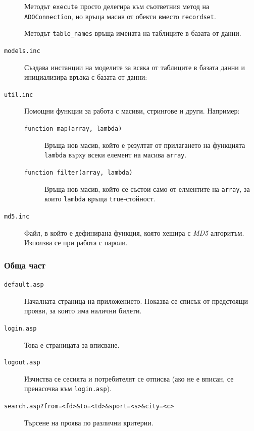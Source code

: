 \documentclass[a4paper,10pt, leqno]{article}
\renewcommand{\lstlistingname}{\bfseries Файл}
\newcommand{\term}[1] {\textsl{#1}}
\newcommand{\File}[1] {\texttt{#1}}
\begin{document}
\begin{description}
            Методът \texttt{execute} просто делегира към съответния метод на \texttt{ADOConnection}, но връща масив от обекти вместо
            \texttt{recordset}.

            Методът \texttt{table\_names} връща имената на таблиците в базата от данни.

        \item[\File{models.inc}]
            Създава инстанции на моделите за всяка от таблиците в базата данни и инициализира връзка с базата от данни:
            
            \renewcommand{\lstlistingname}{\bfseries Файл}
        \item[\File{util.inc}]
            Помощни функции за работа с масиви, стрингове и други. Например:
            \begin{description}
                \item[\texttt{function map(array, lambda)}]
                    Връща нов масив, който е резултат от прилагането на функцията \texttt{lambda} върху всеки елемент на масива \texttt{array}.
                \item[\texttt{function filter(array, lambda)}]
                    Връща нов масив, който се състои само от елментите на \texttt{array}, за които \texttt{lambda} връща \texttt{true}-стойност.
            \end{description}
        \item[\File{md5.inc}]
            Файл, в който е дефинирана функция, която хешира с \term{MD5} алгоритъм. Използва се при работа с пароли.

    \end{description}


    \subsubsection{Обща част}
    \begin{description}
        \item[\File{default.asp}]
            Началната страница на приложението. Показва се списък от предстоящи прояви, за които има налични билети.
        \item[\File{login.asp}]
            Това е страницата за вписване.
        \item[\File{logout.asp}]
            Изчиства се сесията и потребителят се отписва (ако не е вписан, се пренасочва към \File{login.asp}).
        \item[\File{search.asp?from=<fd>\&to=<td>\&sport=<s>\&city=<c>}]
            Търсене на проява по различни критерии.
    \end{description}
\end{document}
